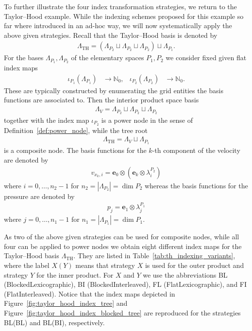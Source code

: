 \documentclass[a4paper,10pt,headings=normal,bibliography=totoc]{scrartcl}
\begin{document}
To further illustrate the four index transformation strategies, we return to
the Taylor--Hood example.
While the indexing schemes proposed for this example so far where
introduced in an ad-hoc way, we will now systematically apply
the above given strategies.  Recall that the Taylor--Hood basis is denoted by
\begin{align*}
 \Lambda_\text{TH}
  = (\Lambda_{P_2} \sqcup \Lambda_{P_2} \sqcup \Lambda_{P_2}) \sqcup \Lambda_{P_1}.
\end{align*}
For the bases $\Lambda_{P_1}, \Lambda_{P_2}$
of the elementary spaces $P_1,P_2$ we consider fixed given flat index maps
\begin{align*}
  \iota_{P_1}(\Lambda_{P_1}) &\to \mathbb{N}_0, &
  \iota_{P_2}(\Lambda_{P_2}) &\to \mathbb{N}_0.
\end{align*}
These are typically constructed by enumerating the grid entities
the basis functions are associated to.
Then the interior product space basis
\begin{align*}
  \Lambda_V = \Lambda_{P_2} \sqcup \Lambda_{P_2} \sqcup \Lambda_{P_2}
\end{align*}
together with the index map $\iota_{P_2}$ is a power node in the
sense of Definition~\ref{def:power_node}, while the tree root
\begin{align*}
 \Lambda_\text{TH}
  = \Lambda_V \sqcup \Lambda_{P_1}
\end{align*}
is a composite node.
The basis functions for the $k$-th component of the velocity
are denoted by
\begin{align*}
  v_{x_k,i} = \mathbf{e}_0 \otimes (\mathbf{e}_k \otimes \lambda^{P_2}_i)
\end{align*}
where $i=0,\dots,n_2-1$ for $n_2=|\Lambda_{P_2}|= \operatorname{dim} P_2$
whereas the basis functions for the pressure are denoted by
\begin{align*}
  p_{j} = \mathbf{e}_1 \otimes \lambda^{P_1}_j
\end{align*}
where $j=0,\dots,n_1-1$ for $n_1=|\Lambda_{P_1}|= \operatorname{dim} P_1$.

As two of the above given strategies can be used
for composite nodes, while all four can be applied to power nodes
we obtain eight different index maps for the Taylor--Hood basis
$\Lambda_{\text{TH}}$.
They are listed in Table~\ref{tab:th_indexing_variants}, where the label $X(Y)$
means that strategy $X$ is used for the outer product and strategy $Y$
for the inner product. For $X$ and $Y$ we use the abbreviations BL
(BlockedLexicographic), BI (BlockedInterleaved), FL (FlatLexicographic), and FI (FlatInterleaved).
Notice that the index maps depicted in
Figure~\ref{fig:taylor_hood_index_tree} and Figure~\ref{fig:taylor_hood_index_blocked_tree}
are reproduced for the strategies
BL(BL) and BL(BI), respectively.
\end{document}
